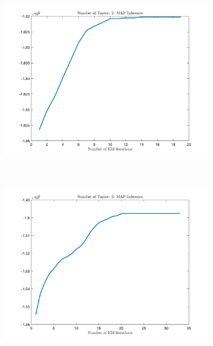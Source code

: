 \documentclass[12pt]{article}
\begin{document}
\begin{figure}[ht]
	\centering
	\begin{subfigure}{0.4\textwidth}
		\includegraphics[width=\textwidth]{images/MAP/Q_map_2_topics.jpg}
		\caption{}
		\label{fig:Q_MAP_2}
	\end{subfigure}
	~
	\begin{subfigure}{0.4\textwidth}
		\includegraphics[width=\textwidth]{images/MAP/Q_map_3_topics.jpg}
		\caption{}
		\label{fig:Q_MAP_3}
	\end{subfigure}
	~	
	\begin{subfigure}{0.4\textwidth}

\end{subfigure}
\end{figure}
\end{document}
